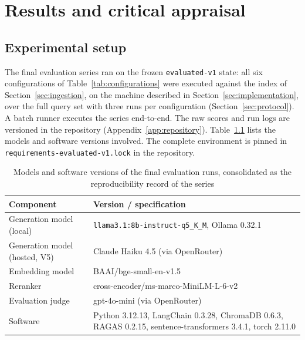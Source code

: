 \chapter{Results and critical appraisal}
\label{ch:results}

\section{Experimental setup}
\label{sec:experimental-setup}

The final evaluation series ran on the frozen \texttt{evaluated-v1}
state: all six configurations of Table~\ref{tab:configurations} were
executed against the index of Section~\ref{sec:ingestion}, on the
machine described in Section~\ref{sec:implementation}, over the full
query set with three runs per configuration
(Section~\ref{sec:protocol}). A batch runner executes the series
end-to-end. The raw scores and run logs are versioned in the repository
(Appendix~\ref{app:repository}). Table~\ref{tab:environment} lists the
models and software versions involved. The complete environment is
pinned in \texttt{requirements-evaluated-v1.lock} in the repository.

\begin{table}[H]
    \centering
    \small
    \begin{tabular}{lp{}}
        \toprule
        \textbf{Component} & \textbf{Version / specification} \\
        \midrule
        Generation model (local) & \texttt{llama3.1:8b-instruct-q5\_K\_M},
            Ollama 0.32.1 \\
        Generation model (hosted, V5) & Claude Haiku 4.5 (via OpenRouter) \\
        Embedding model & BAAI/bge-small-en-v1.5 \\
        Reranker & cross-encoder/ms-marco-MiniLM-L-6-v2 \\
        Evaluation judge & gpt-4o-mini (via OpenRouter) \\
        Software & Python 3.12.13, LangChain 0.3.28, ChromaDB 0.6.3,
            RAGAS 0.2.15, sentence-transformers 3.4.1, torch 2.11.0 \\
        \bottomrule
    \end{tabular}
    \caption{Models and software versions of the final evaluation runs,
             consolidated as the reproducibility record of the series}
    \label{tab:environment}
\end{table}

